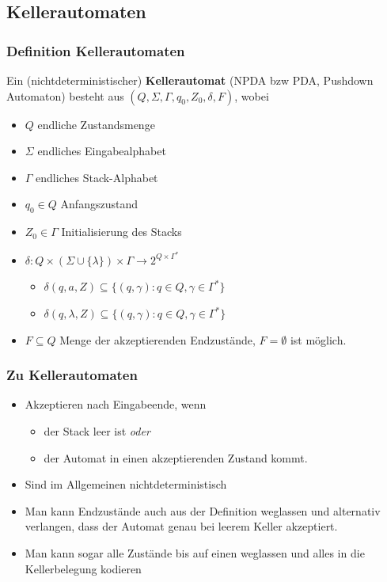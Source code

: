 \subsection{Kellerautomaten}
\begin{frame}
	\frametitle{Definition Kellerautomaten}
	Ein (nichtdeterministischer) \textbf{Kellerautomat} (NPDA bzw PDA, Pushdown Automaton) besteht aus $(Q, \Sigma, \Gamma, q_0, Z_0,\delta, F)$, wobei
	\begin{itemize}
		\item $Q$ endliche Zustandsmenge
		\item $\Sigma$ endliches Eingabealphabet
		\item $\Gamma$ endliches Stack-Alphabet
		\item $q_0 \in Q$ Anfangszustand
		\item $Z_0 \in \Gamma$ Initialisierung des Stacks
		\item $\delta : Q \times ( \Sigma \cup \{\lambda\}) \times \Gamma \rightarrow 2^{Q \times \Gamma^*}$
		\begin{itemize}
			\item $\delta(q, a, Z) \subseteq \{(q,\gamma) : q \in Q, \gamma \in \Gamma^*\}$
			\item $\delta(q, \lambda, Z) \subseteq \{(q,\gamma) : q \in Q, \gamma \in \Gamma^*\}$
		\end{itemize}
		\item $F \subseteq Q$ Menge der akzeptierenden Endzustände, $F=\emptyset$ ist möglich.
		
		\vspace{-4cm}
	\end{itemize}
\end{frame}

\begin{frame}
\frametitle{Zu Kellerautomaten}
\begin{itemize}
\item Akzeptieren nach Eingabeende, wenn \begin{itemize}
	\item der Stack leer ist \emph{oder}
	\item der Automat in einen akzeptierenden Zustand kommt.
\end{itemize}
\item Sind im Allgemeinen nichtdeterministisch
\item Man kann Endzustände auch aus der Definition weglassen und alternativ verlangen, dass der Automat genau bei leerem Keller akzeptiert.
\item Man kann sogar alle Zustände bis auf einen weglassen und alles in die Kellerbelegung kodieren
\end{itemize}
\end{frame}

